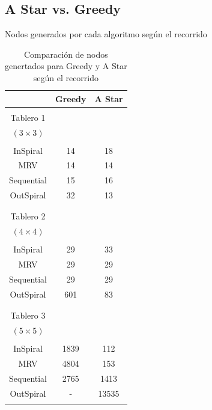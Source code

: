 \documentclass[%
    final,
    reprint,
    notitlepage,
    narroweqnarray,
    inline,
    twoside,
    invited
    ]{ieee}
\begin{document}
\clearpage


\subsection{A Star vs. Greedy}

\par Nodos generados por cada algoritmo según el recorrido

\begin{table}[H]
\begin{center}
\begin{tabular}{|c|c|c|}
\hline
 & Greedy &  A Star\\

\hline
\hline

&&\\
Tablero 1 & & \\
$(3\times 3)$ & & \\
&&\\
\hline
InSpiral & 14 & 18 \\
\hline
MRV & 14 & 14 \\
\hline
Sequential & 15 & 16 \\
\hline
OutSpiral & 32 & 13 \\
\hline
&&\\

\hline
\hline

&&\\
Tablero 2 & & \\
$(4\times 4)$ & & \\
&&\\
\hline
InSpiral & 29 & 33 \\
\hline
MRV & 29 & 29 \\
\hline
Sequential & 29 & 29 \\
\hline
OutSpiral & 601 & 83 \\
\hline
&&\\

\hline
\hline

&&\\
Tablero 3 & & \\
$(5\times 5)$ & & \\
&&\\
\hline
InSpiral & 1839 & 112 \\
\hline
MRV & 4804 & 153 \\
\hline
Sequential & 2765 & 1413 \\
\hline
OutSpiral & - & 13535 \\
\hline
&&\\

\hline
\hline

\end{tabular}
\end{center}
\caption{Comparación de nodos genertados para Greedy y A Star según el recorrido}\label{tablaAStar}
\end{table}
\end{document}
